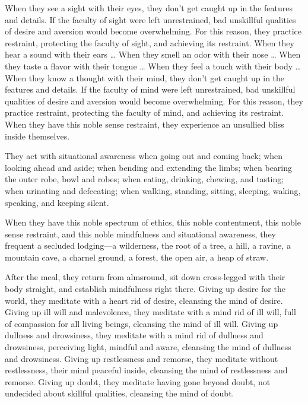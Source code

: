\documentclass[12pt,openany]{book}%
\begin{document}
When they see a sight with their eyes, they don’t get caught up in the features and details. If the faculty of sight were left unrestrained, bad unskillful qualities of desire and aversion would become overwhelming. For this reason, they practice restraint, protecting the faculty of sight, and achieving its restraint. When they hear a sound with their ears … When they smell an odor with their nose … When they taste a flavor with their tongue … When they feel a touch with their body … When they know a thought with their mind, they don’t get caught up in the features and details. If the faculty of mind were left unrestrained, bad unskillful qualities of desire and aversion would become overwhelming. For this reason, they practice restraint, protecting the faculty of mind, and achieving its restraint. When they have this noble sense restraint, they experience an unsullied bliss inside themselves. 

They act with situational awareness when going out and coming back; when looking ahead and aside; when bending and extending the limbs; when bearing the outer robe, bowl and robes; when eating, drinking, chewing, and tasting; when urinating and defecating; when walking, standing, sitting, sleeping, waking, speaking, and keeping silent. 

When they have this noble spectrum of ethics, this noble contentment, this noble sense restraint, and this noble mindfulness and situational awareness, they frequent a secluded lodging—a wilderness, the root of a tree, a hill, a ravine, a mountain cave, a charnel ground, a forest, the open air, a heap of straw. 

After the meal, they return from almsround, sit down cross-legged with their body straight, and establish mindfulness right there. Giving up desire for the world, they meditate with a heart rid of desire, cleansing the mind of desire. Giving up ill will and malevolence, they meditate with a mind rid of ill will, full of compassion for all living beings, cleansing the mind of ill will. Giving up dullness and drowsiness, they meditate with a mind rid of dullness and drowsiness, perceiving light, mindful and aware, cleansing the mind of dullness and drowsiness. Giving up restlessness and remorse, they meditate without restlessness, their mind peaceful inside, cleansing the mind of restlessness and remorse. Giving up doubt, they meditate having gone beyond doubt, not undecided about skillful qualities, cleansing the mind of doubt. 
\end{document}
